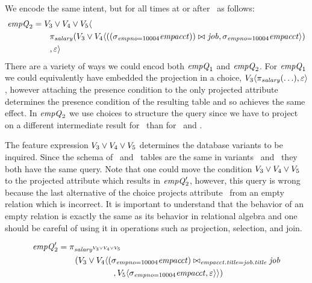 We encode the same intent, but for all times at or after \vThree\ as follows:
%
\begin{align*}
\eq_2 &=  \vThree\vee\vFour\vee\vFive \langle \\
&\hspace{20pt}\pi_\salary 
 (\vThree\vee\vFour\langle
 \joinRelR{(\vSel[\empno=10004]{\empacct})}{\job}
             {}, 
{\vSel[\empno=10004]{\empacct}}\rangle)\\
&\hspace{20pt}, \empRel\rangle
\end{align*}
%
\noindent
There are a variety of ways we could encod both $\eq_1$ and $\eq_2$.
%
For $\eq_1$ we could equivalently have embedded the projection in a choice,
$\chc[\vThree]{\vPrj[\salary]{(\ldots)},\empRel}$, however attaching the presence
condition to the only projected attribute determines the presence condition of
the resulting table and so achieves the same effect.
%
In $\eq_2$ we use choices to structure the query since we have to project on a
different intermediate result for \vFive\ than for \vThree\ and \vFour.

 The feature expression $\vThree \vee \vFour \vee \vFive$
 determines the database variants to be inquired. 
 Since the schema of \empacct\ and \job\ tables are the same
 in variants \vThree\ and \vFour\ they both have the same 
 query. Note that one could move the condition 
 $\vThree \vee \vFour \vee \vFive$ to the projected attribute
 which results in $\VVal {\eq_2}$, however, this query is wrong 
 because the last alternative of the choice projects attribute \salary\
 from an empty relation which is incorrect. It is important to 
 understand that the behavior of an empty relation is exactly the
 same as its behavior in relational algebra and one
 should be careful of using it in operations such as projection,
 selection, and join.

 \begin{align*}
 \small
 \VVal {\eq_2} &= 
 \pi_{\oatt \salary {\vThree \vee \vFour \vee \vFive}}\\
 &\qquad
 (\vThree \vee \vFour\langle
 (\sigma_{\empno=10004} \empacct)
 \bowtie_{\empacct . \titleatt = \job . \titleatt}
 \job\\
 &\hspace{66pt},
 \vFive\langle{\selectRel {\empno=10004} \empacct},
 \empRel
 \rangle
 \rangle)
 \end{align*}

